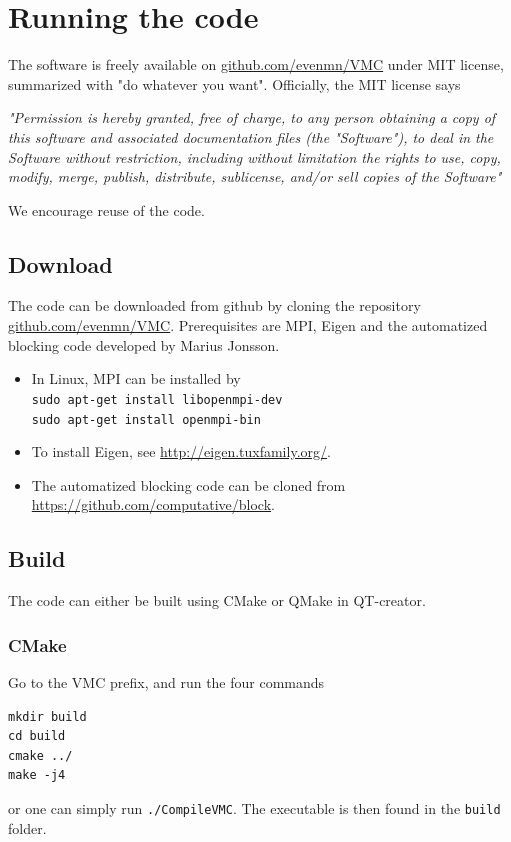 \section{Running the code}
The software is freely available on \url{github.com/evenmn/VMC} under MIT license, summarized with "do whatever you want". Officially, the MIT license says \cite{noauthor_mit_nodate}\bigskip

\textit{"Permission is hereby granted, free of charge, to any person obtaining a copy
	of this software and associated documentation files (the "Software"), to deal
	in the Software without restriction, including without limitation the rights
	to use, copy, modify, merge, publish, distribute, sublicense, and/or sell
	copies of the Software"}

We encourage reuse of the code.

\subsection{Download}
The code can be downloaded from github by cloning the repository \url{github.com/evenmn/VMC}. Prerequisites are MPI, Eigen and the automatized blocking code developed by Marius Jonsson. 
\begin{itemize}
	\item In Linux, MPI can be installed by\\
	\lstinline{sudo apt-get install libopenmpi-dev}\\
	\lstinline{sudo apt-get install openmpi-bin}
	\item To install Eigen, see \url{http://eigen.tuxfamily.org/}.
	\item The automatized blocking code can be cloned from \url{https://github.com/computative/block}.
\end{itemize}

\subsection{Build}
The code can either be built using CMake or QMake in QT-creator. 

\subsubsection{CMake}
Go to the VMC prefix, and run the four commands
\lstset{basicstyle=\scriptsize}
\begin{lstlisting}
mkdir build
cd build
cmake ../
make -j4
\end{lstlisting}
or one can simply run \lstinline{./CompileVMC}. The executable is then found in the \lstinline{build} folder.

